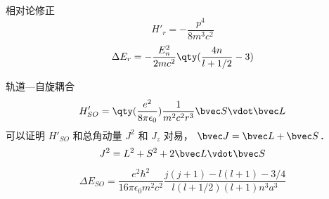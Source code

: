 \begin{issues}
\issueTODO
\end{issues}

相对论修正
\begin{equation}
H'_r = -\frac{p^4}{8m^3 c^2}
\end{equation}
\begin{equation}
\Delta E_r = -\frac{E_n^2}{2mc^2} \qty(\frac{4n}{l+1/2}-3)
\end{equation}

轨道—自旋耦合
\begin{equation}
H'_{SO} = \qty(\frac{e^2}{8\pi\epsilon_0}) \frac{1}{m^2c^2 r^3} \bvec S \vdot \bvec L
\end{equation}
可以证明 $H'_{SO}$ 和总角动量 $J^2$ 和 $J_z$ 对易， $\bvec J = \bvec L + \bvec S$．
\begin{equation}
J^2 = L^2 + S^2 + 2\bvec L \vdot \bvec S
\end{equation}

\begin{equation}
\Delta E_{SO} = \frac{e^2\hbar^2}{16\pi\epsilon_0 m^2 c^2} \frac{j(j+1) - l(l+1) - 3/4}{l(l+1/2)(l+1)n^3 a^3}
\end{equation}


